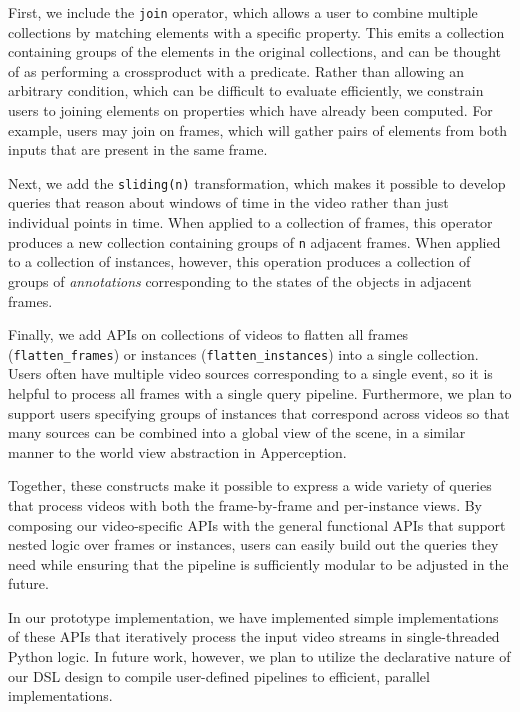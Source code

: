 First, we include the \texttt{join} operator, which allows a user to combine multiple collections by matching elements with a specific property. This emits a collection containing groups of the elements in the original collections, and can be thought of as performing a crossproduct with a predicate. Rather than allowing an arbitrary condition, which can be difficult to evaluate efficiently, we constrain users to joining elements on properties which have already been computed. For example, users may join on frames, which will gather pairs of elements from both inputs that are present in the same frame.

Next, we add the \texttt{sliding(n)} transformation, which makes it possible to develop queries that reason about windows of time in the video rather than just individual points in time. 
When applied to a collection of frames, this operator produces a new collection containing groups of \texttt{n} adjacent frames. 
When applied to a collection of instances, however, this operation produces a collection of groups of \emph{annotations} corresponding to the states of the objects in adjacent frames.

Finally, we add APIs on collections of videos to flatten all frames (\texttt{flatten\_frames}) or instances (\texttt{flatten\_instances}) into a single collection. Users often have multiple video sources corresponding to a single event, so it is helpful to process all frames with a single query pipeline. Furthermore, we plan to support users specifying groups of instances that correspond across videos so that many sources can be combined into a global view of the scene, in a similar manner to the world view abstraction in Apperception.

Together, these constructs make it possible to express a wide variety of queries that process videos with both the frame-by-frame and per-instance views. By composing our video-specific APIs with the general functional APIs that support nested logic over frames or instances, users can easily build out the queries they need while ensuring that the pipeline is sufficiently modular to be adjusted in the future.

In our prototype implementation, we have implemented simple implementations of these APIs that iteratively process the input video streams in single-threaded Python logic. In future work, however, we plan to utilize the declarative nature of our DSL design to compile user-defined pipelines to efficient, parallel implementations.
